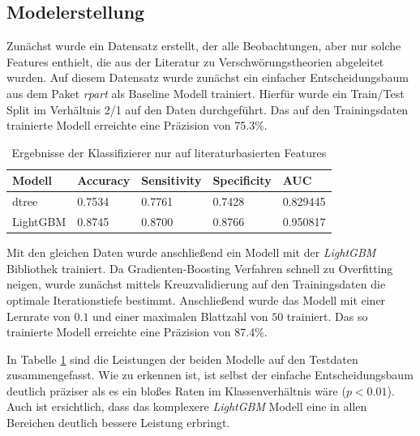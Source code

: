 \subsection{Modelerstellung}

Zunächst wurde ein Datensatz erstellt, der alle Beobachtungen, aber nur solche Features enthielt, die aus der Literatur zu Verschwörungstheorien abgeleitet wurden.
Auf diesem Datensatz wurde zunächst ein einfacher Entscheidungsbaum aus dem Paket \textit{rpart} \parencite[]{rpart} als Baseline Modell trainiert.
Hierfür wurde ein Train/Test Split im Verhältnis 2/1 auf den Daten durchgeführt.
Das auf den Trainingsdaten trainierte Modell erreichte eine Präzision von 75.3\%.


\begin{table}
    \begin{center}
        \begin{tabularx}{\textwidth}{X|XXXX}
            \toprule
            Modell & Accuracy & Sensitivity & Specificity & AUC\\
            \midrule
            dtree & 0.7534 & 0.7761 & 0.7428 & 0.829445 \\
            LightGBM & 0.8745 & 0.8700 & 0.8766 & 0.950817 \\
            \bottomrule
        \end{tabularx}
        \caption{Ergebnisse der Klassifizierer nur auf literaturbasierten Features}
        \label{small-model}
    \end{center}
\end{table}


Mit den gleichen Daten wurde anschließend ein Modell mit der \textit{LightGBM} Bibliothek \parencite[][]{lightgbm} trainiert.
Da Gradienten-Boosting Verfahren schnell zu Overfitting neigen, wurde zunächst mittels Kreuzvalidierung auf den Trainingsdaten die optimale Iterationstiefe bestimmt.
Anschließend wurde das Modell mit einer Lernrate von $0.1$ und einer maximalen Blattzahl von $50$ trainiert.
Das so trainierte Modell erreichte eine Präzision von 87.4\%.

In Tabelle \ref{small-model} sind die Leistungen der beiden Modelle auf den Testdaten zusammengefasst.
Wie zu erkennen ist, ist selbst der einfache Entscheidungsbaum deutlich präziser als es ein bloßes Raten im Klassenverhältnis wäre ($p < 0.01$).
Auch ist ersichtlich, dass das komplexere \textit{LightGBM} Modell eine in allen Bereichen deutlich bessere Leistung erbringt.

